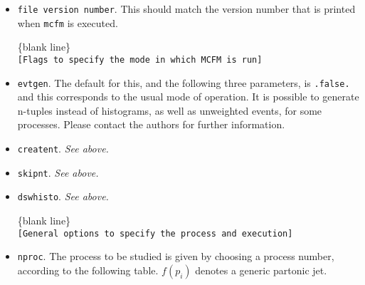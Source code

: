\documentclass[12pt]{article}
\begin{document}
\begin{itemize}
\item {\tt file version number}. This should match the version number
that is printed when {\tt mcfm} is executed.

\begin{center}
\{blank line\} \\
{\tt [Flags to specify the mode in which MCFM is run] }
\end{center}

\item {\tt evtgen}. The default for this, and the following three
parameters, is {\tt .false.} and this corresponds to the usual mode
of operation. It is possible to generate n-tuples instead of histograms,
as well as unweighted events, for some processes. Please contact the
authors for further information.
\item {\tt creatent}. {\it See above.}
\item {\tt skipnt}. {\it See above.}
\item {\tt dswhisto}. {\it See above.}

\begin{center}
\{blank line\} \\
{\tt [General options to specify the process and execution] }
\end{center}

\item {\tt nproc}.
The process to be studied is given by
choosing a process number, according to the following table.
$f(p_i)$ denotes a generic partonic jet.


\end{itemize}
\end{document}

